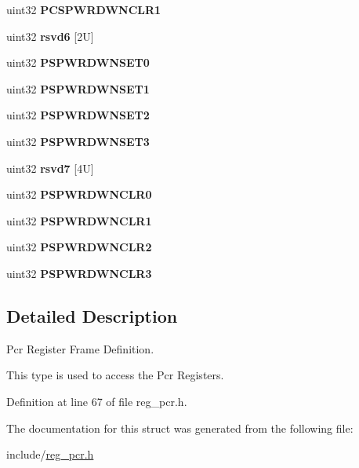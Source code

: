 \begin{DoxyCompactItemize}
uint32 {\bfseries P\+C\+S\+P\+W\+R\+D\+W\+N\+C\+L\+R1}
\item 
\mbox{\label{structpcrBase_abe453dcc4eccb3397e8b02b16c2c2762}} 
uint32 {\bfseries rsvd6} \mbox{[}2\+U\mbox{]}
\item 
\mbox{\label{structpcrBase_a737747de57d4d7107166bf233100213d}} 
uint32 {\bfseries P\+S\+P\+W\+R\+D\+W\+N\+S\+E\+T0}
\item 
\mbox{\label{structpcrBase_afff1577d584c9f69acae3632319ba08b}} 
uint32 {\bfseries P\+S\+P\+W\+R\+D\+W\+N\+S\+E\+T1}
\item 
\mbox{\label{structpcrBase_a8855ad5cd286df6e2a37ab3ec4e121aa}} 
uint32 {\bfseries P\+S\+P\+W\+R\+D\+W\+N\+S\+E\+T2}
\item 
\mbox{\label{structpcrBase_a4a7d81c94f5c7cb85495cc4361473076}} 
uint32 {\bfseries P\+S\+P\+W\+R\+D\+W\+N\+S\+E\+T3}
\item 
\mbox{\label{structpcrBase_a127ee2edc843bd2063b5f999419adab1}} 
uint32 {\bfseries rsvd7} \mbox{[}4\+U\mbox{]}
\item 
\mbox{\label{structpcrBase_a2d5b7345adcae269e686df342b1a2905}} 
uint32 {\bfseries P\+S\+P\+W\+R\+D\+W\+N\+C\+L\+R0}
\item 
\mbox{\label{structpcrBase_a97b7cc7ffc78195ed0baa0cba7b772ae}} 
uint32 {\bfseries P\+S\+P\+W\+R\+D\+W\+N\+C\+L\+R1}
\item 
\mbox{\label{structpcrBase_a0c2656c837dcf2d1629902ec60134b0e}} 
uint32 {\bfseries P\+S\+P\+W\+R\+D\+W\+N\+C\+L\+R2}
\item 
\mbox{\label{structpcrBase_a61149cc48e243aea10fe62a900234802}} 
uint32 {\bfseries P\+S\+P\+W\+R\+D\+W\+N\+C\+L\+R3}
\end{DoxyCompactItemize}


\subsection{Detailed Description}
Pcr Register Frame Definition. 

This type is used to access the Pcr Registers. 

Definition at line 67 of file reg\+\_\+pcr.\+h.



The documentation for this struct was generated from the following file\+:\begin{DoxyCompactItemize}
\item 
include/\mbox{\hyperlink{reg__pcr_8h}{reg\+\_\+pcr.\+h}}\end{DoxyCompactItemize}
